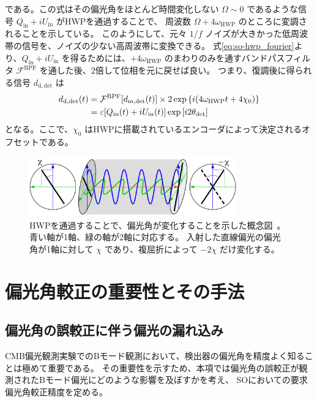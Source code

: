 \documentclass[../../main.tex]{subfiles}
\begin{document}
である。この式はその偏光角をほとんど時間変化しない $\Omega\sim0$ であるような信号 $Q_{\mathrm{in}}+iU_{\mathrm{in}}$ がHWPを通過することで、
周波数 $\Omega + 4\omega_{\mathrm{HWP}}$ のところに変調されることを示している。
このようにして、元々 $1/f$ ノイズが大きかった低周波帯の信号を、ノイズの少ない高周波帯に変換できる。
式\eqref{eq:so-hwp_fourier}より、$Q_{\mathrm{in}}+iU_{\mathrm{in}}$ を得るためには、$+4\omega_{\mathrm{HWP}}$ のまわりのみを通すバンドパスフィルタ $\mathcal{F}^{\mathrm{BPF}}$ を通した後、2倍して位相を元に戻せば良い。
つまり、復調後に得られる信号 $d_{\mathrm{d, det}}$ は
\begin{align}
    d_{\mathrm{d, det}}(t) &= \mathcal{F}^{\mathrm{BPF}}\qty[d_{\mathrm{m,det}}(t)]\times 2\exp\qty{i\qty(4\omega_{\mathrm{HWP}}t + 4\chi_0)} \\
    &= \varepsilon\qty[Q_{\mathrm{in}}(t) + iU_{\mathrm{in}}(t)]\exp\qty[i2\theta_{\mathrm{det}}]
    \label{eq:so-hwp_demod}
\end{align}
となる。ここで、$\chi_0$ はHWPに搭載されているエンコーダによって決定されるオフセットである。

\begin{figure}[H]
    \centering
    \includegraphics[width=0.8\textwidth]{simons_observatory/hwp_satoru.pdf}
    \caption{HWPを通過することで、偏光角が変化することを示した概念図~\cite{takakura_PhD}。青い軸が1軸、緑の軸が2軸に対応する。
    入射した直線偏光の偏光角が1軸に対して $\chi$ であり、複屈折によって $-2\chi$ だけ変化する。}
    \label{fig:so-hwp_satoru}
\end{figure}

\section{偏光角較正の重要性とその手法}
\subsection{偏光角の誤較正に伴う偏光の漏れ込み}
CMB偏光観測実験でのBモード観測において、検出器の偏光角を精度よく知ることは極めて重要である。
その重要性を示すため、本項では偏光角の誤較正が観測されたBモード偏光にどのような影響を及ぼすかを考え、
SOにおいての要求偏光角較正精度を定める。
\end{document}

